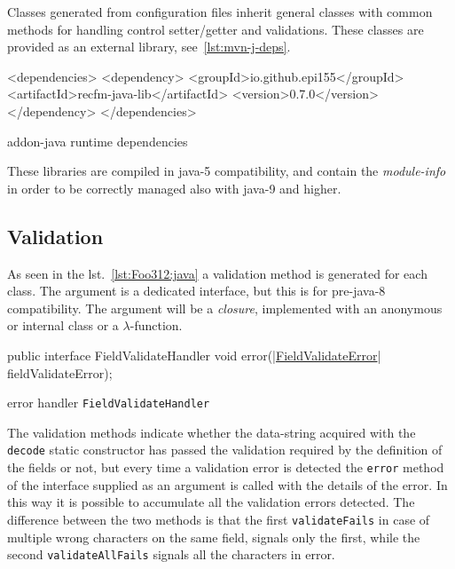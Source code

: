 Classes generated from configuration files inherit general classes with common 
methods for handling control setter/getter and validations. These classes are 
provided as an external library, see~\ref{lst:mvn-j-deps}.

\begin{elisting}[!htb]
\begin{xmlcode}
<dependencies>
  <dependency>
    <groupId>io.github.epi155</groupId>
    <artifactId>recfm-java-lib</artifactId>
    <version>0.7.0</version>
  </dependency>
</dependencies>
\end{xmlcode}
\caption{addon-java runtime dependencies}
\label{lst:mvn-j-deps}
\end{elisting}

These libraries are compiled in java-5 compatibility, and contain the 
\textsl{module-info} in order to be correctly managed also with java-9 and 
higher.

\subsection{Validation}
As seen in the lst.~\ref{lst:Foo312:java} a validation method is generated for 
each class. 
The argument is a dedicated interface, but this is for pre-java-8 compatibility. 
The argument will be a \textit{closure}, implemented with an anonymous or 
internal class or a $\lambda$-function.

\begin{elisting}[!htb]
\begin{javacode}
public interface FieldValidateHandler {
    void error(|\hyperref[lst:FieldValidateError:java]{FieldValidateError}| fieldValidateError);
}
\end{javacode}
\caption{error handler \texttt{FieldValidateHandler}}
\label{lst:FieldValidateHandler:java}
\end{elisting}

The validation methods indicate whether the data-string acquired with the 
\texttt{decode} static constructor has passed the validation required by the 
definition of the fields or not, but every time a validation error is detected 
the \texttt{error} method of the interface supplied as an argument is called 
with the details of the error. In this way it is possible to accumulate all the 
validation errors detected. 
The difference between the two methods is that the first \texttt{validateFails} 
in case of multiple wrong characters on the same field, signals only the first, 
while the second \texttt{validateAllFails} signals all the characters in error.

